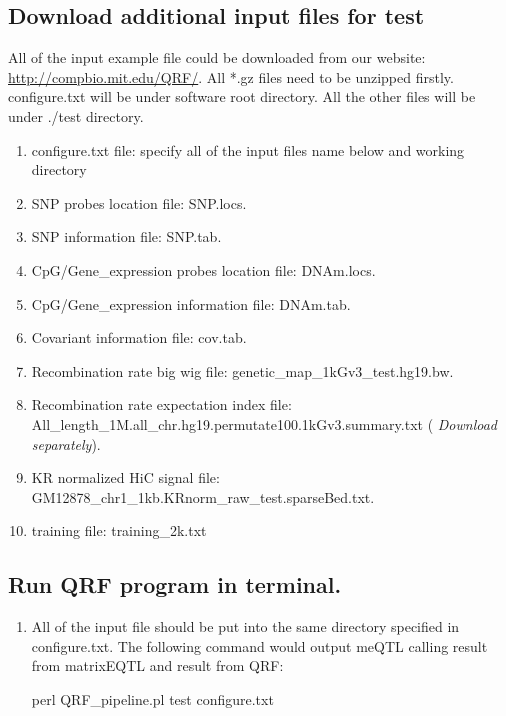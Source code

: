 \documentclass[12pt]{article}
\begin{document}
{\color{blue}\subsection{Download additional input files for test}}
All of the input example file could be downloaded from our website: \url{http://compbio.mit.edu/QRF/}.  All *.gz files need to be unzipped firstly. configure.txt will be under software root directory. All the other files will be under ./test directory.
\begin{enumerate}

\item configure.txt file: specify all of the input files name below and working directory 
\item SNP probes location file: SNP.locs. 
\item SNP information file: SNP.tab. 
\item CpG/Gene\_expression probes location file: DNAm.locs. 
\item CpG/Gene\_expression  information file: DNAm.tab. 
\item Covariant information file: cov.tab. 
\item Recombination rate big wig file: genetic\_map\_1kGv3\_test.hg19.bw. 
\item Recombination rate expectation index file: All\_length\_1M.all\_chr.hg19.permutate100.1kGv3.summary.txt (\emph{\color{red} Download separately}). 
\item KR normalized HiC signal file: GM12878\_chr1\_1kb.KRnorm\_raw\_test.sparseBed.txt. 
\item training file: training\_2k.txt 

\end{enumerate}

{\color{blue}\subsection{Run QRF program in terminal.}}

\begin{enumerate}
\item All of the input file should be put into the same directory specified in configure.txt. The following command would output meQTL calling result from matrixEQTL and result from QRF:
\begin{verbatimtab}
perl QRF_pipeline.pl test configure.txt
\end{verbatimtab}
\end{enumerate}
\end{document}
